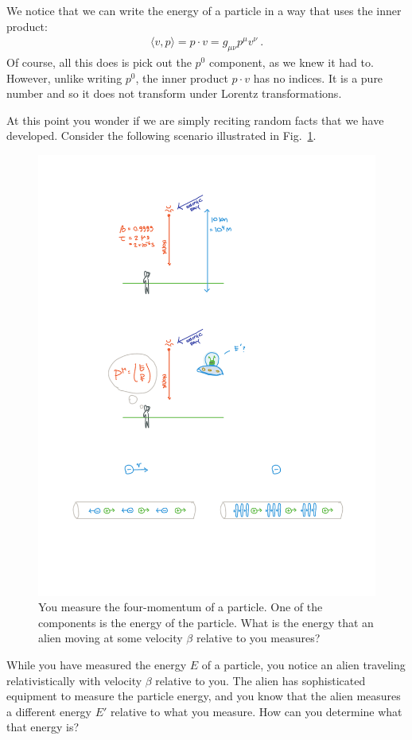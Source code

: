 \documentclass[12pt]{article}
\begin{document}
We notice that we can write the energy of a particle in a way that uses the inner product:
\begin{align}
    \langle v, p\rangle = p\cdot v = g_{\mu\nu} p^\mu v^\nu \ .
\end{align}
Of course, all this does is pick out the $p^0$ component, as we knew it had to. However, unlike writing $p^0$, the inner product $p\cdot v$ has no indices. It is a pure number and so it does not transform under Lorentz transformations. 

At this point you wonder if we are simply reciting random facts that we have developed. Consider the following scenario illustrated in Fig.~\ref{fig:alien}.
% 
\begin{figure}[tb]
    \centering
    \includegraphics[width=.8\textwidth]{figures/alien.pdf}
    \caption{You measure the four-momentum of a particle. One of the components is the energy of the particle. What is the energy that an alien moving at some velocity $\beta$ relative to you measures?}
    \label{fig:alien}
\end{figure}
% 
While you have measured the energy $E$ of a particle, you notice an alien traveling relativistically with velocity $\beta$ relative to you. The alien has sophisticated equipment to measure the particle energy, and you know that the alien measures a different energy $E'$ relative to what you measure. How can you determine what that energy is?
\end{document}
